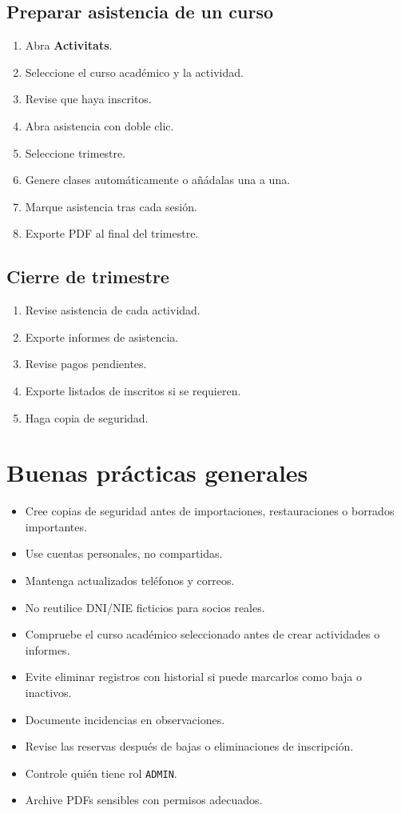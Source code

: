 \documentclass[12pt]{article}
\newcommand{\menu}[1]{\textbf{#1}}
\newcommand{\estado}[1]{\texttt{#1}}
\begin{document}
\subsection{Preparar asistencia de un curso}
\begin{enumerate}
  \item Abra \menu{Activitats}.
  \item Seleccione el curso académico y la actividad.
  \item Revise que haya inscritos.
  \item Abra asistencia con doble clic.
  \item Seleccione trimestre.
  \item Genere clases automáticamente o añádalas una a una.
  \item Marque asistencia tras cada sesión.
  \item Exporte PDF al final del trimestre.
\end{enumerate}

\subsection{Cierre de trimestre}
\begin{enumerate}
  \item Revise asistencia de cada actividad.
  \item Exporte informes de asistencia.
  \item Revise pagos pendientes.
  \item Exporte listados de inscritos si se requieren.
  \item Haga copia de seguridad.
\end{enumerate}

\section{Buenas prácticas generales}
\begin{itemize}
  \item Cree copias de seguridad antes de importaciones, restauraciones o borrados importantes.
  \item Use cuentas personales, no compartidas.
  \item Mantenga actualizados teléfonos y correos.
  \item No reutilice DNI/NIE ficticios para socios reales.
  \item Compruebe el curso académico seleccionado antes de crear actividades o informes.
  \item Evite eliminar registros con historial si puede marcarlos como baja o inactivos.
  \item Documente incidencias en observaciones.
  \item Revise las reservas después de bajas o eliminaciones de inscripción.
  \item Controle quién tiene rol \estado{ADMIN}.
  \item Archive PDFs sensibles con permisos adecuados.
\end{itemize}
\end{document}
